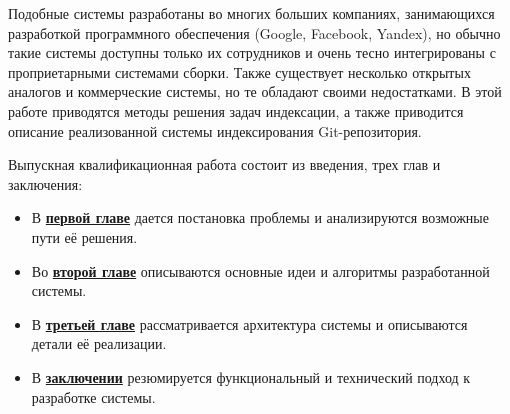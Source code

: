 Подобные системы разработаны во многих больших компаниях, занимающихся разработкой программного обеспечения (Google, Facebook\facebook, Yandex), но обычно такие системы доступны только их сотрудников и очень тесно интегрированы с проприетарными системами сборки. Также существует несколько открытых аналогов и коммерческие системы, но те обладают своими недостатками. В этой работе приводятся методы решения задач индексации, а также приводится описание реализованной системы индексирования Git-репозитория.

Выпускная квалификационная работа состоит из введения, трех глав и заключения:

\begin{itemize}
    \item В \hyperref[chap:overview]{\textbf{первой главе}} дается постановка проблемы и анализируются возможные пути её решения.
    \item Во \hyperref[chap:solution]{\textbf{второй главе}} описываются основные идеи и алгоритмы разработанной системы.
    \item В \hyperref[chap:architecture]{\textbf{третьей главе}} рассматривается архитектура системы и описываются детали её реализации.
    \item В \hyperref[chap:final]{\textbf{заключении}} резюмируется функциональный и технический подход к разработке системы.
\end{itemize}

\clearpage
